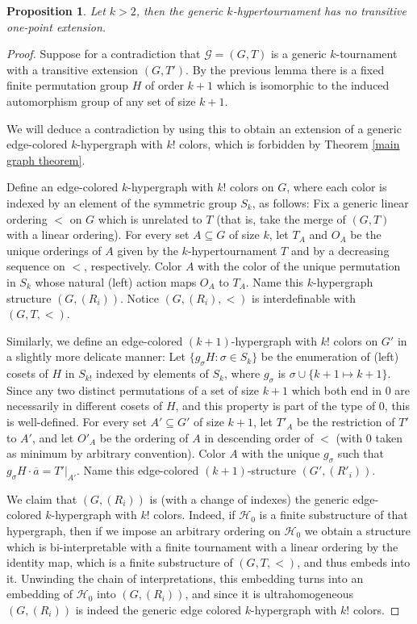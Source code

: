 \documentclass{amsart}
\newtheorem{proposition}[theorem]{Proposition}
\def\graph{\mathcal{G}}
\newcommand{\set}[1]{\{#1 \}}
\begin{document}
\begin{proposition}
    Let $k> 2$, then the generic $k$-hypertournament has no transitive one-point extension.
\end{proposition}
\begin{proof}
    Suppose for a contradiction that $\graph = (G, T)$ is a generic $k$-tournament with a transitive extension $(G, T')$. By the previous lemma there is a fixed finite permutation group $H$ of order $k+1$ which is isomorphic to the induced automorphism group of any set of size $k+1$.  

    We will deduce a contradiction by using this to obtain an extension of a generic edge-colored $k$-hypergraph with $k!$ colors, which is forbidden by Theorem \ref{main graph theorem}.

    Define an edge-colored $k$-hypergraph with $k!$ colors on $G$, where each color is indexed by an element of the symmetric group $S_k$, as follows: Fix a generic linear ordering $<$ on $G$ which is unrelated to $T$ (that is, take the merge of $(G,T)$ with a linear ordering). For every set $A \subseteq G$ of size $k$, let $T_A$ and $O_A$ be the unique orderings of $A$ given by the $k$-hypertournament $T$ and by a decreasing sequence on $<$, respectively. Color $A$ with the color of the unique permutation in $S_k$ whose natural (left) action maps $O_A$ to $T_A$. Name this $k$-hypergraph structure $(G, (R_i))$. Notice $(G, (R_i), <)$ is interdefinable with $(G, T, <)$.

    Similarly, we define an edge-colored $(k+1)$-hypergraph with $k!$ colors on $G'$ in a slightly more delicate manner: Let $\set{g_\sigma H: \sigma \in S_k}$ be the enumeration of (left) cosets of $H$ in $S_{k!}$ indexed by elements of $S_k$, where $g_\sigma$ is $\sigma \cup \set{k+1 \mapsto k+1}$. Since any two distinct permutations of a set of size $k+1$ which both end in 0 are necessarily in different cosets of $H$, and this property is part of the type of 0, this is well-defined. For every set $A' \subseteq G'$ of size $k+1$, let $T'_A$ be the restriction of $T'$ to $A'$, and let $O'_A$ be the ordering of $A$ in descending order of $<$ (with 0 taken as minimum by arbitrary convention). Color $A$ with the unique $g_\sigma$ such that $g_\sigma H \cdot \overline{a} = T'|_{A'}$. Name this edge-colored $(k+1)$-structure $(G', (R'_i))$.

    We claim that $(G,(R_i))$ is (with a change of indexes) the generic edge-colored $k$-hypergraph with $k!$ colors. Indeed, if $\mathcal{H}_0$ is a finite substructure of that hypergraph, then if we impose an arbitrary ordering on $\mathcal{H}_0$ we obtain a structure which is bi-interpretable with a finite tournament with a linear ordering by the identity map, which is a finite substructure of $(G, T, <)$, and thus embeds into it. Unwinding the chain of interpretations, this embedding turns into an embedding of $\mathcal{H}_0$ into $(G, (R_i))$, and since it is ultrahomogeneous $(G, (R_i))$ is indeed the generic edge colored $k$-hypergraph with $k!$ colors.
    

\end{proof}
\end{document}
